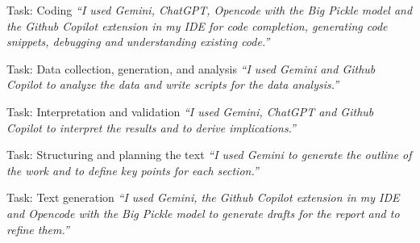 \documentclass[11pt]{article}
\begin{document}
\vspace{.25em}

\begin{answerbox}{Task: Coding}
     \textit{``I used Gemini, ChatGPT, Opencode with the Big Pickle model and the Github Copilot extension in my IDE for code completion, generating code snippets, debugging and understanding existing code.''}
\end{answerbox}

\vspace{.25em}

\begin{answerbox}{Task: Data collection, generation, and analysis}
     \textit{``I used Gemini and Github Copilot to analyze the data and write scripts for the data analysis.''}
\end{answerbox}

\vspace{.25em}

\begin{answerbox}{Task: Interpretation and validation}
     \textit{``I used Gemini, ChatGPT and Github Copilot to interpret the results and to derive implications.''}
\end{answerbox}

\vspace{.25em}

\begin{answerbox}{Task: Structuring and planning the text}
     \textit{``I used Gemini to generate the outline of the work and to define key points for each section.''}
\end{answerbox}

\vspace{.25em}

\begin{answerbox}{Task: Text generation}
     \textit{``I used Gemini, the Github Copilot extension in my IDE and Opencode with the Big Pickle model to generate drafts for the report and to refine them.''}
\end{answerbox}
\end{document}
